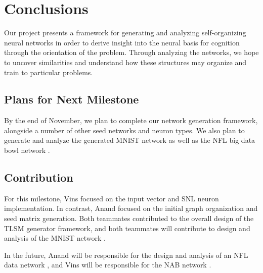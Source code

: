 \section{Conclusions} \label{sec:Conclusions}

Our project presents a framework for generating and analyzing self-organizing
neural networks in order to derive insight into the neural basis for cognition
through the orientation of the problem. Through analyzing the networks, we hope
to uncover similarities and understand how these structures may organize and
train to particular problems.

\subsection{Plans for Next Milestone}

By the end of November, we plan to complete our network generation framework,
alongside a number of other seed networks and neuron types. We also plan to
generate and analyze the generated MNIST network \cite{MNIST Dataset} as well
as the NFL big data bowl network \cite{NFL Dataset}.

\subsection{Contribution}

For this milestone, Vins focused on the input vector and SNL neuron
implementation. In contrast, Anand focused on the initial graph organization and
seed matrix generation. Both teammates contributed to the overall design of the
TLSM generator framework, and both teammates will contribute to design and
analysis of the MNIST network \cite{MNIST Dataset}.

In the future, Anand will be responsible for the design and analysis of an NFL
data network \cite{NFL Dataset}, and Vins will be responsible for the NAB
network \cite{NAB Dataset}.